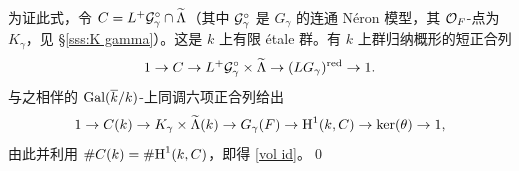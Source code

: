 为证此式，令 $C=L^{+}\mathcal{G}^{\circ}_{\gamma}\cap \widetilde{\Lambda}$（其中 $\mathcal{G}^{\circ}_{\gamma}$ 是 $G_{\gamma}$ 的连通 Néron 模型，其 $\mathcal{O}_{F}$-点为 $K_{\gamma}$，见 \S\ref{sss:K gamma}）。这是 $k$ 上有限 étale 群。有 $k$ 上群归纳概形的短正合列
\begin{equation*}
1\to C\to L^{+}\mathcal{G}^{\circ}_{\gamma}\times\widetilde{\Lambda}\to (LG_{\gamma})^{\textup{red}}\to 1.
\end{equation*}
与之相伴的 $\textup{Gal}(\overline{k}/k)$-上同调六项正合列给出
\begin{equation*}
1\to C(k)\to K_{\gamma}\times \widetilde{\Lambda}(k)\to G_{\gamma}(F)\to \textup{H}^{1}({k,C})\to \ker(\theta)\to1,
\end{equation*}
由此并利用 $\#C(k)=\#\textup{H}^{1}({k,C})$，即得 \eqref{vol id}。\qed
